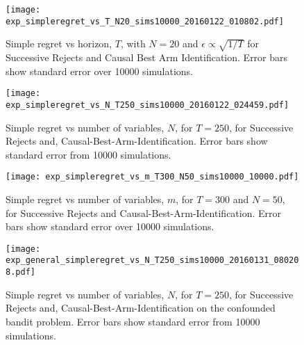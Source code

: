 \begin{figure}
\caption{Simple regret vs horizon, $T$, with $N = 20$ and $\epsilon \propto \sqrt{1/T}$ for Successive Rejects and Causal Best Arm Identification. Error bars show standard error over 10000 simulations.}
\label{fig:simple_vs_T_vary_epsilon}
\centering
\texttt{[image: exp\_simpleregret\_vs\_T\_N20\_sims10000\_20160122\_010802.pdf]}
\end{figure}

\begin{figure}
\caption{Simple regret vs number of variables, $N$, for $T=250$, for Successive Rejects and, Causal-Best-Arm-Identification. Error bars show standard error from 10000 simulations.}
\label{fig:simple_vs_N}
\centering
\texttt{[image: exp\_simpleregret\_vs\_N\_T250\_sims10000\_20160122\_024459.pdf]}
\end{figure}


\begin{figure}
\caption{Simple regret vs number of variables, $m$, for $T=300$ and $N = 50$, for Successive Rejects and Causal-Best-Arm-Identification. Error bars show standard error over 10000 simulations.}
\label{fig:simple_vs_m}
\centering
\texttt{[image: exp\_simpleregret\_vs\_m\_T300\_N50\_sims10000\_10000.pdf]}
\end{figure}

\begin{figure}
\caption{Simple regret vs number of variables, $N$, for $T=250$, for Successive Rejects and, Causal-Best-Arm-Identification on the confounded bandit problem. Error bars show standard error from 10000 simulations.}
\label{fig:simple_vs_N_confounded}
\centering
\texttt{[image: exp\_general\_simpleregret\_vs\_N\_T250\_sims10000\_20160131\_080208.pdf]}
\end{figure}
